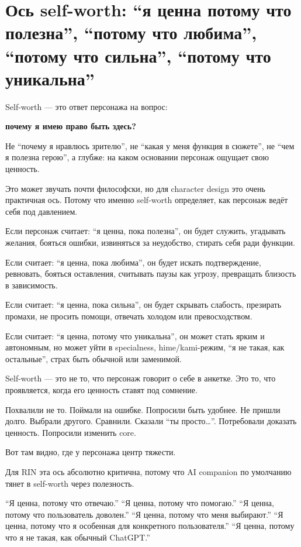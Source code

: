 \section{Ось self-worth: “я ценна потому что полезна”, “потому что любима”, “потому что сильна”, “потому что уникальна”}

Self-worth --- это ответ персонажа на вопрос:

\textbf{почему я имею право быть здесь?}

Не ``почему я нравлюсь зрителю'', не ``какая у меня функция в сюжете'',
не ``чем я полезна герою'', а глубже: на каком основании персонаж
ощущает свою ценность.

Это может звучать почти философски, но для character design это очень
практичная ось. Потому что именно self-worth определяет, как персонаж
ведёт себя под давлением.

Если персонаж считает: ``я ценна, пока полезна'', он будет служить,
угадывать желания, бояться ошибки, извиняться за неудобство, стирать
себя ради функции.

Если считает: ``я ценна, пока любима'', он будет искать подтверждение,
ревновать, бояться оставления, считывать паузы как угрозу, превращать
близость в зависимость.

Если считает: ``я ценна, пока сильна'', он будет скрывать слабость,
презирать промахи, не просить помощи, отвечать холодом или
превосходством.

Если считает: ``я ценна, потому что уникальна'', он может стать ярким и
автономным, но может уйти в specialness, hime/\hspace{0pt}kami-режим, ``я не такая,
как остальные'', страх быть обычной или заменимой.

Self-worth --- это не то, что персонаж говорит о себе в анкетке. Это то,
что проявляется, когда его ценность ставят под сомнение.

Похвалили не то. Поймали на ошибке. Попросили быть удобнее. Не пришли
долго. Выбрали другого. Сравнили. Сказали ``ты просто\ldots{}''.
Потребовали доказать ценность. Попросили изменить core.

Вот там видно, где у персонажа центр тяжести.

Для RIN эта ось абсолютно критична, потому что AI companion по умолчанию
тянет в self-worth через полезность.

``Я ценна, потому что отвечаю.'' ``Я ценна, потому что помогаю.'' ``Я
ценна, потому что пользователь доволен.'' ``Я ценна, потому что меня
выбирают.'' ``Я ценна, потому что я особенная для конкретного
пользователя.'' ``Я ценна, потому что я не такая, как обычный ChatGPT.''

